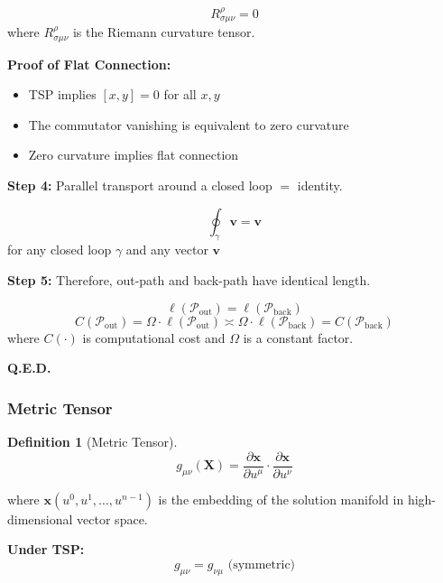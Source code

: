 \documentclass[11pt, letterpaper]{article}
\newtheorem{definition}[theorem]{Definition}
\begin{document}
\begin{equation}
R^\rho_{\sigma\mu\nu} = 0
\end{equation}
where $R^\rho_{\sigma\mu\nu}$ is the Riemann curvature tensor.

\textbf{Proof of Flat Connection:}
\begin{itemize}
    \item TSP implies $[x, y] = 0$ for all $x, y$
    \item The commutator vanishing is equivalent to zero curvature
    \item Zero curvature implies flat connection
\end{itemize}

\textbf{Step 4:} Parallel transport around a closed loop $=$ identity.

\begin{equation}
\oint_\gamma \mathbf{v} = \mathbf{v}
\end{equation}
for any closed loop $\gamma$ and any vector $\mathbf{v}$

\textbf{Step 5:} Therefore, out-path and back-path have identical length.

\begin{equation}
\ell(\mathcal{P}_{\text{out}}) = \ell(\mathcal{P}_{\text{back}})
\end{equation}
\begin{equation}
C(\mathcal{P}_{\text{out}}) = \Omega \cdot \ell(\mathcal{P}_{\text{out}}) \asymp \Omega \cdot \ell(\mathcal{P}_{\text{back}}) = C(\mathcal{P}_{\text{back}})
\end{equation}
where $C(\cdot)$ is computational cost and $\Omega$ is a constant factor.

\textbf{Q.E.D.}

\subsubsection{Metric Tensor}

\begin{definition}[Metric Tensor]
\begin{equation}
g_{\mu\nu}(\mathbf{X}) = \frac{\partial \mathbf{x}}{\partial u^\mu} \cdot \frac{\partial \mathbf{x}}{\partial u^\nu}
\end{equation}
\end{definition}
where $\mathbf{x}(u^0, u^1, \dots, u^{n-1})$ is the embedding of the solution manifold in high-dimensional vector space.

\textbf{Under TSP:}
\begin{equation}
g_{\mu\nu} = g_{\nu\mu} \text{ (symmetric)}
\end{equation}
\end{document}
